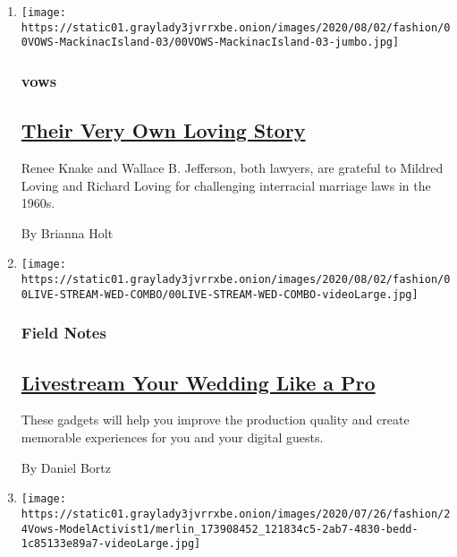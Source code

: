 \begin{enumerate}
\def\labelenumi{\arabic{enumi}.}
\item
  \texttt{[image: https://static01.graylady3jvrrxbe.onion/images/2020/08/02/fashion/00VOWS-MackinacIsland-03/00VOWS-MackinacIsland-03-jumbo.jpg]}

  \hypertarget{vows}{%
  \subsubsection{vows}\label{vows}}

  \hypertarget{their-very-own-loving-story}{%
  \subsection{\texorpdfstring{\href{/2020/07/31/fashion/weddings/Renee-Knake-and-Wallace-Jefferson-wed-tribute-to-Lovings-before-them.html}{Their
  Very Own Loving
  Story}}{Their Very Own Loving Story}}\label{their-very-own-loving-story}}

  Renee Knake and Wallace B. Jefferson, both lawyers, are grateful to
  Mildred Loving and Richard Loving for challenging interracial marriage
  laws in the 1960s.

  By Brianna Holt
\item
  \texttt{[image: https://static01.graylady3jvrrxbe.onion/images/2020/08/02/fashion/00LIVE-STREAM-WED-COMBO/00LIVE-STREAM-WED-COMBO-videoLarge.jpg]}

  \hypertarget{field-notes}{%
  \subsubsection{Field Notes}\label{field-notes}}

  \hypertarget{livestream-your-wedding-like-a-pro}{%
  \subsection{\texorpdfstring{\href{/2020/07/28/fashion/weddings/livestream-your-wedding-like-a-pro.html}{Livestream
  Your Wedding Like a
  Pro}}{Livestream Your Wedding Like a Pro}}\label{livestream-your-wedding-like-a-pro}}

  These gadgets will help you improve the production quality and create
  memorable experiences for you and your digital guests.

  By Daniel Bortz
\item
  \texttt{[image: https://static01.graylady3jvrrxbe.onion/images/2020/07/26/fashion/24Vows-ModelActivist1/merlin\_173908452\_121834c5-2ab7-4830-bedd-1c85133e89a7-videoLarge.jpg]}


\end{enumerate}
